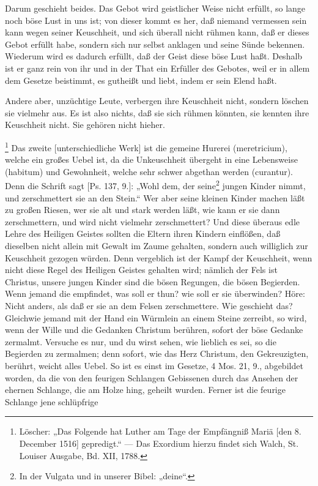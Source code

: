 Darum geschieht beides. Das Gebot wird geistlicher Weise nicht erfüllt, so lange noch böse Lust in uns ist; von dieser kommt es her, daß niemand vermessen sein kann wegen seiner Keuschheit, und sich überall nicht rühmen kann, daß er dieses Gebot erfüllt habe, sondern sich nur selbst anklagen und seine Sünde bekennen. Wiederum wird es dadurch erfüllt, daß der Geist diese böse Lust haßt. Deshalb ist er ganz rein von ihr und in der That ein Erfüller des Gebotes, weil er in allem dem Gesetze beistimmt, es gutheißt und liebt, indem er sein Elend haßt.

Andere aber, unzüchtige Leute, verbergen ihre Keuschheit nicht, sondern löschen sie vielmehr aus. Es ist also nichts, daß sie sich rühmen könnten, sie kennten ihre Keuschheit nicht. Sie gehören nicht hieher.

\footnote{Löscher: „Das Folgende hat Luther am Tage der Empfängniß Mariä [den 8. December 1516] gepredigt.“ — Das Exordium hierzu findet sich Walch, St. Louiser Ausgabe, Bd. XII, 1788.} Das zweite [unterschiedliche Werk] ist die gemeine Hurerei (meretricium), welche ein großes Uebel ist, da die Unkeuschheit übergeht in eine Lebensweise (habitum) und Gewohnheit, welche sehr schwer abgethan werden (curantur). Denn die Schrift sagt [Ps. 137, 9.]: „Wohl dem, der seine\footnote{In der Vulgata und in unserer Bibel: „deine“.} jungen Kinder nimmt, und zerschmettert sie an den Stein.“ Wer aber seine kleinen Kinder machen läßt zu großen Riesen, wer sie alt und stark werden läßt, wie kann er sie dann zerschmettern, und wird nicht vielmehr zerschmettert? Und diese überaus edle Lehre des Heiligen Geistes sollten die Eltern ihren Kindern einflößen, daß dieselben nicht allein mit Gewalt im Zaume gehalten, sondern auch williglich zur Keuschheit gezogen würden. Denn vergeblich ist der Kampf der Keuschheit, wenn nicht diese Regel des Heiligen Geistes gehalten wird; nämlich der Fels ist Christus, unsere jungen Kinder sind die bösen Regungen, die bösen Begierden. Wenn jemand die empfindet, was soll er thun? wie soll er sie überwinden? Höre: Nicht anders, als daß er sie an dem Felsen zerschmettere. Wie geschieht das? Gleichwie jemand mit der Hand ein Würmlein an einem Steine zerreibt, so wird, wenn der Wille und die Gedanken Christum berühren, sofort der böse Gedanke zermalmt. Versuche es nur, und du wirst sehen, wie lieblich es sei, so die Begierden zu zermalmen; denn sofort, wie das Herz Christum, den Gekreuzigten, berührt, weicht alles Uebel. So ist es einst im Gesetze, 4 Mos. 21, 9., abgebildet worden, da die von den feurigen Schlangen Gebissenen durch das Ansehen der ehernen Schlange, die am Holze hing, geheilt wurden. Ferner ist die feurige Schlange jene schlüpfrige

